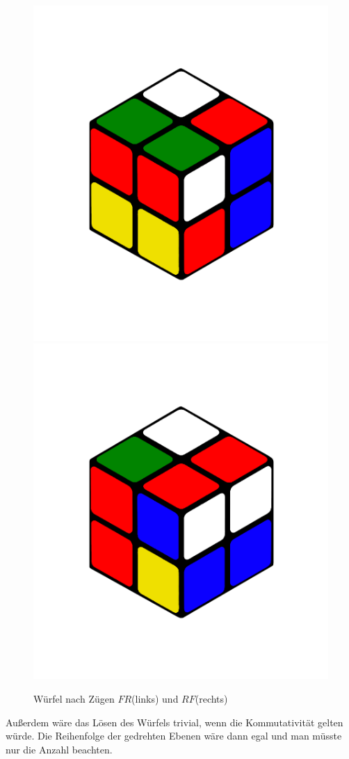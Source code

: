 \documentclass[12pt,a4paper, usenames, dvipsnames]{article}
\begin{document}
\begin{figure}[h]
\centering
\includegraphics[scale=0.1]{RF.png}
\includegraphics[scale=0.1]{FR.png}
\caption[Würfel nach Zügen $FR$(links) und $RF$(rechts)]{Würfel nach Zügen $FR$(links) und $RF$(rechts)}
\label{12}
\end{figure}
Außerdem wäre das Lösen des Würfels trivial, wenn die Kommutativität gelten würde.\cite{TD} Die Reihenfolge der gedrehten Ebenen wäre dann egal und man müsste nur die Anzahl beachten. 
\end{document}
